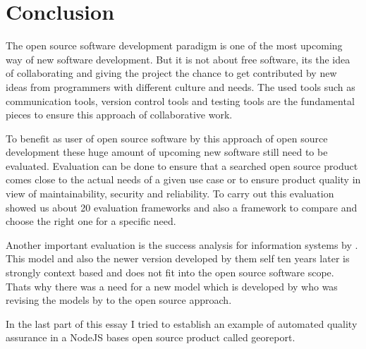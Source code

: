 \documentclass[DIV=calc,paper=a4,fontsize=9pt,twocolumn]{scrartcl}
\begin{document}
\section{Conclusion}

The open source software development paradigm is one of the most upcoming way of new software development. But it is not about free software, its the idea of collaborating and giving the project the chance to get contributed by new ideas from programmers with different culture and needs. The used tools such as communication tools, version control tools and testing tools are the fundamental pieces to ensure this approach of collaborative work.

To benefit as user of open source software by this approach of open source development these huge amount of upcoming new software still need to be evaluated. Evaluation can be done to ensure that a searched open source product comes close to the actual needs of a given use case or to ensure product quality in view of maintainability, security and reliability. To carry out this evaluation \citet{stol2010comparison} showed us about 20 evaluation frameworks and also a framework to compare and choose the right one for a specific need.

Another important evaluation is the success analysis for information systems by \citet{delone1992information}. This model and also the newer version developed by them self ten years later is strongly context based and does not fit into the open source software scope. Thats why there was a need for a new model which is developed by \citet{lee2009measuring} who was revising the models by \citet{delone1992information} to the open source approach.

In the last part of this essay I tried to establish an example of automated quality assurance in a NodeJS bases open source product called georeport.


\end{document}
